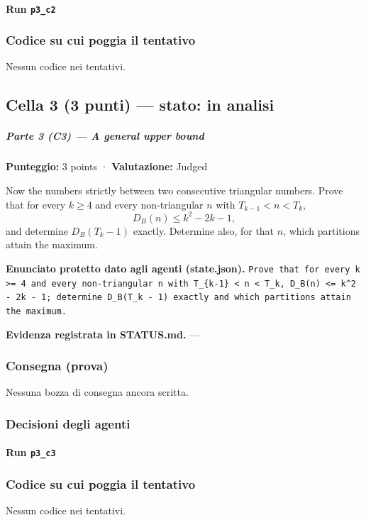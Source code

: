 \documentclass[11pt,a4paper]{article}
\begin{document}
\paragraph{Run \texttt{p3\_c2}}

\subsubsection{Codice su cui poggia il tentativo}
Nessun codice nei tentativi.

\subsection{Cella 3 (3 punti) — stato: in analisi}
\subparagraph{Parte 3 (C3) --- A general upper
bound}\label{parte-3-c3-a-general-upper-bound}

\textbf{Punteggio:} 3 points · \textbf{Valutazione:} Judged

Now the numbers strictly between two consecutive triangular numbers.
Prove that for every \(k \ge 4\) and every non-triangular \(n\) with
\(T_{k-1} < n < T_k\), \[
D_B(n) \le k^2 - 2k - 1,
\] and determine \(D_B(T_k - 1)\) exactly. Determine also, for that
\(n\), which partitions attain the maximum.

\textbf{Enunciato protetto dato agli agenti (state.json).} \texttt{Prove that for every k \textgreater{}= 4 and every non-triangular n with T\_\{k-1\} \textless{} n \textless{} T\_k, D\_B(n) \textless{}= k\textasciicircum{}2 - 2k - 1; determine D\_B(T\_k - 1) exactly and which partitions attain the maximum.}

\textbf{Evidenza registrata in STATUS.md.} —

\subsubsection{Consegna (prova)}
Nessuna bozza di consegna ancora scritta.

\subsubsection{Decisioni degli agenti}
\paragraph{Run \texttt{p3\_c3}}

\subsubsection{Codice su cui poggia il tentativo}
Nessun codice nei tentativi.
\end{document}
